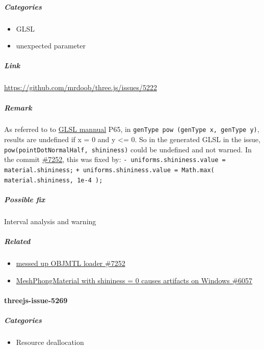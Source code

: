 \documentclass[]{article}
\begin{document}
\subparagraph{Categories}\label{categories-5}

\begin{itemize}
\itemsep1pt\parskip0pt
\item
  GLSL
\item
  unexpected parameter
\end{itemize}

\subparagraph{Link}\label{link-5}

\url{https://github.com/mrdoob/three.js/issues/5222}

\subparagraph{Remark}\label{remark-5}

As referred to to
\href{https://www.khronos.org/registry/gles/specs/2.0/GLSL_ES_Specification_1.0.17.pdf}{GLSL
mannual} P65, in \texttt{genType pow (genType x, genType y)}, results
are undefined if x = 0 and y \textless{}= 0. So in the generated GLSL in
the issue, \texttt{pow(pointDotNormalHalf, shininess)} could be
undefined and not warned. In the commit
\href{https://github.com/mrdoob/three.js/commit/a13cf4343effc741b0aa333c37062cc7cc3d71c7}{\#7252},
this was fixed by:
\texttt{-    uniforms.shininess.value = material.shininess;}
\texttt{+    uniforms.shininess.value = Math.max( material.shininess, 1e-4 );}

\subparagraph{Possible fix}\label{possible-fix-4}

Interval analysis and warning

\subparagraph{Related}\label{related}

\begin{itemize}
\itemsep1pt\parskip0pt
\item
  \href{https://github.com/mrdoob/three.js/issues/7252}{messed up OBJMTL
  loader \#7252}
\item
  \href{https://github.com/mrdoob/three.js/issues/6057}{MeshPhongMaterial
  with shininess = 0 causes artifacts on Windows \#6057}
\end{itemize}

\paragraph{threejs-issue-5269}\label{threejs-issue-5269}

\subparagraph{Categories}\label{categories-6}

\begin{itemize}
\itemsep1pt\parskip0pt
\item
  Resource deallocation
\end{itemize}
\end{document}
